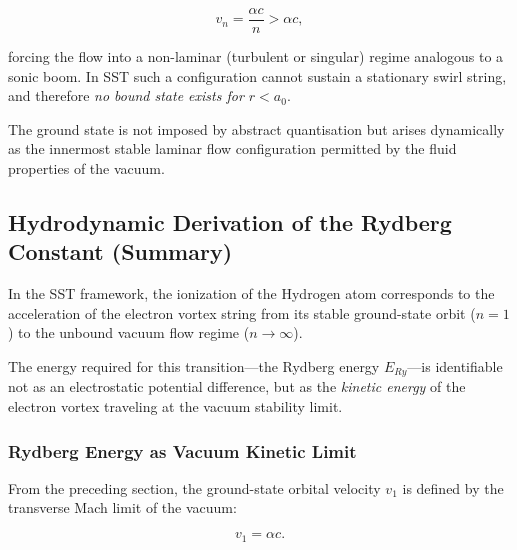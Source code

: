 \documentclass[10pt,reprint,aps,onecolumn,nofootinbib]{revtex4-2}
\begin{document}
            \begin{equation}
                v_n = \frac{\alpha c}{n} > \alpha c,
            \end{equation}

            forcing the flow into a non-laminar (turbulent or singular) regime
            analogous to a sonic boom. In SST such a configuration cannot sustain
            a stationary swirl string, and therefore \emph{no bound state exists
    for $r < a_0$}.

            The ground state is not imposed by abstract quantisation but arises
            dynamically as the innermost stable laminar flow configuration permitted
            by the fluid properties of the vacuum.
    \subsection{Hydrodynamic Derivation of the Rydberg Constant (Summary)}
        \label{sec:SST_rydberg}

        In the SST framework, the ionization of the Hydrogen atom corresponds to
        the acceleration of the electron vortex string from its stable ground-state
        orbit ($n=1$) to the unbound vacuum flow regime ($n \to \infty$).

        The energy required for this transition—the Rydberg energy $E_{Ry}$—is
        identifiable not as an electrostatic potential difference, but as the
        \emph{kinetic energy} of the electron vortex traveling at the vacuum
        stability limit.

        \subsubsection*{Rydberg Energy as Vacuum Kinetic Limit}

            From the preceding section, the ground-state orbital velocity $v_1$ is
            defined by the transverse Mach limit of the vacuum:

            \begin{equation}
                v_1 = \alpha c.
                \label{eq:v1_mach}
            \end{equation}
\end{document}
